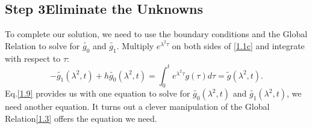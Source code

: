 \documentclass[12pt]{article}
\numberwithin{equation}{section}
\begin{document}
\subsection{Step 3\textemdash Eliminate the Unknowns}
To complete our solution, we need to use the boundary conditions and the Global Relation to solve for $\tilde{g_0}$ and $\tilde{g_1}$.  Multiply $e^{\lambda^2\tau}$ on both sides of \eqref{1.1c} and integrate with respect to $\tau$:
\begin{equation}\label{1.9}
    -\tilde{g_1}(\lambda^2,t)+h\tilde{g_0}(\lambda^2,t)=\int_{0}^{t} e^{\lambda^2\tau}g(\tau)d\tau=\tilde{g}(\lambda^2,t).
\end{equation}
Eq.\eqref{1.9} provides us with one equation to solve for $\tilde{g_0}(\lambda^2,t)$ and $\tilde{g_1}(\lambda^2,t)$, we need another equation. It turns out a clever manipulation of the Global Relation\eqref{1.3} offers the equation we need.
\end{document}
